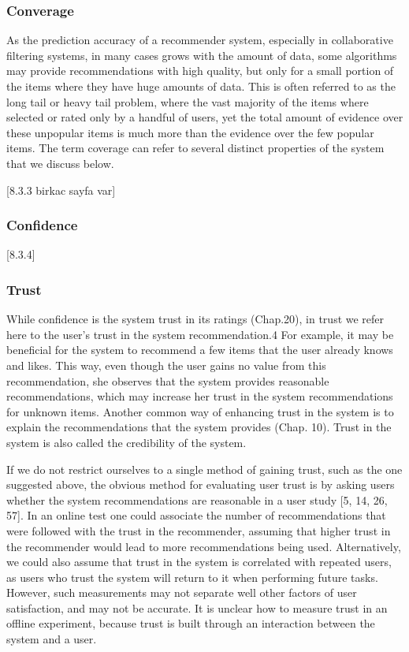 \subsubsection{Converage}

As the prediction accuracy of a recommender system, especially in collaborative filtering systems, in many cases grows with the amount of data, some algorithms may provide recommendations with high quality, but only for a small portion of the items where they have huge amounts of data. This is often referred to as the long tail or heavy tail problem, where the vast majority of the items where selected or rated only by a handful of users, yet the total amount of evidence over these unpopular items is much more than the evidence over the few popular items.
The term coverage can refer to several distinct properties of the system that we discuss below.

[8.3.3 birkac sayfa var]

\subsubsection{Confidence}
[8.3.4]

\subsubsection{Trust}

While confidence is the system trust in its ratings (Chap.20), in trust we refer here to the user’s trust in the system recommendation.4 For example, it may be beneficial for the system to recommend a few items that the user already knows and likes. This way, even though the user gains no value from this recommendation, she observes that the system provides reasonable recommendations, which may increase her trust in the system recommendations for unknown items. Another common way of enhancing trust in the system is to explain the recommendations that the system provides (Chap. 10). Trust in the system is also called the credibility of the system. 

If we do not restrict ourselves to a single method of gaining trust, such as the one suggested above, the obvious method for evaluating user trust is by asking users whether the system recommendations are reasonable in a user study [5, 14, 26, 57]. In an online test one could associate the number of recommendations that were followed with the trust in the recommender, assuming that higher trust in the recommender would lead to more recommendations being used. Alternatively, we could also assume that trust in the system is correlated with repeated users, as users who trust the system will return to it when performing future tasks. However, such measurements may not separate well other factors of user satisfaction, and may not be accurate. It is unclear how to measure trust in an offline experiment, because trust is built through an interaction between the system and a user.

